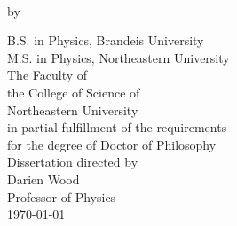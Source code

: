 \documentclass[12pt, oneside]{Thesis} %
\begin{document}
\begin{titlepage}
\begin{center}


{\ttitle}\\[0.4cm] %
 
{by \authornames} %
 
{B.S. in Physics, Brandeis University}\\
{M.S. in Physics, Northeastern University}\\
The Faculty of\\
the College of Science of\\
Northeastern University\\
in partial fulfillment of the requirements\\
for the degree of Doctor of Philosophy\\
Dissertation directed by\\
Darien Wood\\
Professor of Physics\\

 
{\large \today}\\[4cm] %
 
\vfill
\end{center}

\end{titlepage}
\end{document}
